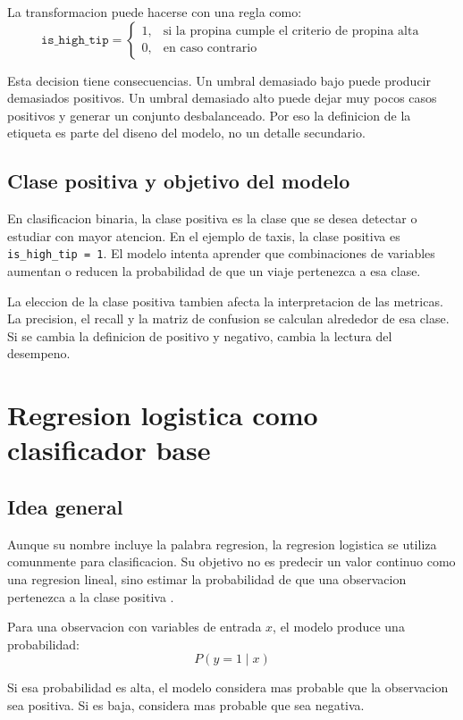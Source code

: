 \documentclass[12pt]{article}
\begin{document}
La transformacion puede hacerse con una regla como:
\[
\texttt{is\_high\_tip} =
\begin{cases}
1, & \text{si la propina cumple el criterio de propina alta}\\
0, & \text{en caso contrario}
\end{cases}
\]

Esta decision tiene consecuencias. Un umbral demasiado bajo puede producir demasiados positivos. Un umbral demasiado alto puede dejar muy pocos casos positivos y generar un conjunto desbalanceado. Por eso la definicion de la etiqueta es parte del diseno del modelo, no un detalle secundario.

\subsection{Clase positiva y objetivo del modelo}
En clasificacion binaria, la clase positiva es la clase que se desea detectar o estudiar con mayor atencion. En el ejemplo de taxis, la clase positiva es \texttt{is\_high\_tip = 1}. El modelo intenta aprender que combinaciones de variables aumentan o reducen la probabilidad de que un viaje pertenezca a esa clase.

La eleccion de la clase positiva tambien afecta la interpretacion de las metricas. La precision, el recall y la matriz de confusion se calculan alrededor de esa clase. Si se cambia la definicion de positivo y negativo, cambia la lectura del desempeno.

\section{Regresion logistica como clasificador base}
\subsection{Idea general}
Aunque su nombre incluye la palabra regresion, la regresion logistica se utiliza comunmente para clasificacion. Su objetivo no es predecir un valor continuo como una regresion lineal, sino estimar la probabilidad de que una observacion pertenezca a la clase positiva \cite{google_logistic_loss}.

Para una observacion con variables de entrada \(x\), el modelo produce una probabilidad:
\[
P(y = 1 \mid x)
\]

Si esa probabilidad es alta, el modelo considera mas probable que la observacion sea positiva. Si es baja, considera mas probable que sea negativa.
\end{document}
